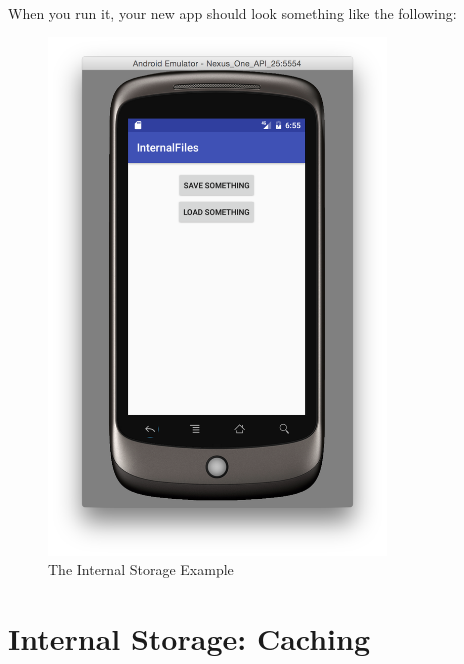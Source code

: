 \paragraph{} When you run it, your new app should look something like the following:

\begin{figure}[H]
\centering
\includegraphics[width=0.8\textwidth]{images/internalstorage_avd}
\caption{The Internal Storage Example}
\label{fig:internalstorage_avd}
\end{figure}


\section{Internal Storage: Caching}

